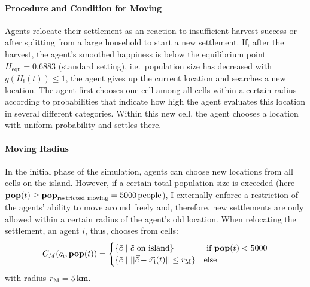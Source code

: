 \paragraph{Procedure and Condition for Moving}
Agents relocate their settlement as an reaction to insufficient harvest success or after splitting from a large household to start a new settlement.
If, after the harvest, the agent's smoothed happiness is below the equilibrium point $H_\text{equ}=0.6883$ (standard setting), i.e.\ population size has decreased with $g(H_\text{i}(t))\leq 1$, the agent gives up the current location and searches a new location.
The agent first chooses one cell among all cells within a certain radius according to probabilities that indicate how high the agent evaluates this location in several different categories.
Within this new cell, the agent chooses a location with uniform probability and settles there.

\paragraph{Moving Radius}
In the initial phase of the simulation, agents can choose new locations from all cells on the island.
However, if a certain total population size is exceeded (here $\mathbf{pop}(t)\geq \mathbf{pop}_\text{restricted moving} = 5000 \, \rm{people}$), I externally enforce a restriction of the agents' ability to move around freely and, therefore, new settlements are only allowed within a certain radius of the agent's old location.
When relocating the settlement, an agent $i$, thus, chooses from cells:
\begin{equation}
C_{M}(c_{\rm i}, \mathbf{pop}(t)) = 
\begin{cases}
\{\tilde{c} \ | \ \tilde{c}\text{ on island}\} & \text{ if } \mathbf{pop}(t) <5000 \\
\{\tilde{c} \ | \ | | \vec{\tilde{c}} - \vec{x_{\rm i}}(t) | |
\leq r_{\rm M} \} & \text{else} 
\end{cases}
\end{equation}
with radius $r_{\rm M} = 5\, {\rm km}$.

